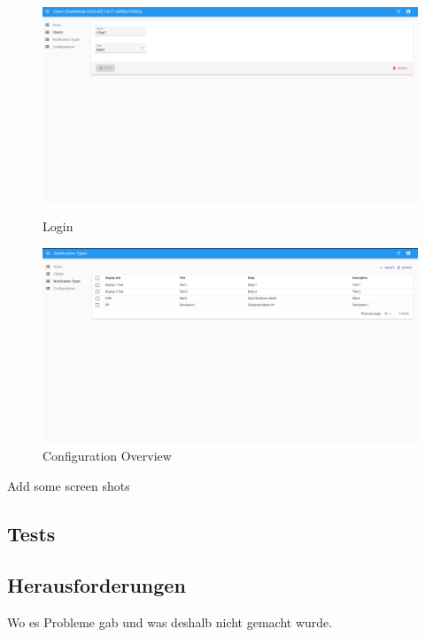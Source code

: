 \begin{figure}[h]
    \centering
    \begin{minipage}[b]{0.4\textwidth}
        \includegraphics[width=\textwidth]{graphics/screenshots/adminui/configuration}
        \caption{Login}
    \end{minipage}
    \hfill
    \begin{minipage}[b]{0.4\textwidth}
        \includegraphics[width=\textwidth]{graphics/screenshots/adminui/notification-type}
        \caption{Configuration Overview}
    \end{minipage}
    \label{fig:AdminUI-Screens2}
\end{figure}




Add some screen shots

\subsection{Tests}

\subsection{Herausforderungen}

Wo es Probleme gab und was deshalb nicht gemacht wurde.







